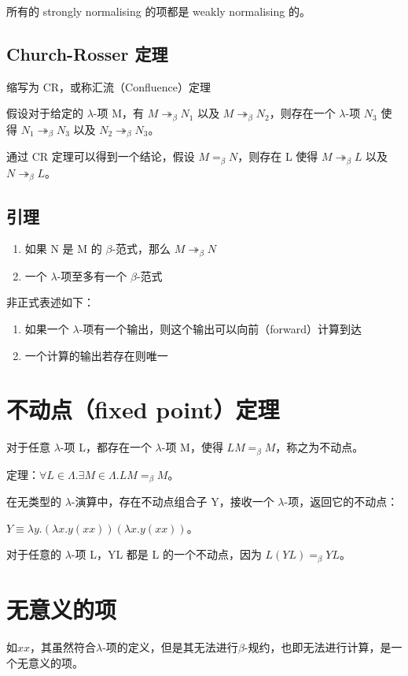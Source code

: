 \documentclass[UTF8]{article}
\begin{document}
	所有的 strongly normalising 的项都是 weakly normalising 的。

\subsection{Church-Rosser 定理}

	缩写为 CR，或称汇流（Confluence）定理

	假设对于给定的 $\lambda$-项 M，有 $M \twoheadrightarrow_\beta N_1$ 以及 $M \twoheadrightarrow_\beta N_2$，则存在一个 $\lambda$-项 $N_3$ 使得 $N_1 \twoheadrightarrow_\beta N_3$ 以及 $N_2 \twoheadrightarrow_\beta N_3$。

	通过 CR 定理可以得到一个结论，假设 $M =_\beta N$，则存在 L 使得 $M \twoheadrightarrow_\beta L$ 以及 $N \twoheadrightarrow_\beta L$。

\subsection{引理}

	\begin{enumerate}
		\item 如果 N 是 M 的 $\beta$-范式，那么 $M \twoheadrightarrow_\beta N$
		\item 一个 $\lambda$-项至多有一个 $\beta$-范式
	\end{enumerate}

	非正式表述如下：
	\begin{enumerate}
		\item 如果一个 $\lambda$-项有一个输出，则这个输出可以向前（forward）计算到达
		\item 一个计算的输出若存在则唯一
	\end{enumerate}

\section{不动点（fixed point）定理}

	对于任意 $\lambda$-项 L，都存在一个 $\lambda$-项 M，使得 $LM =_\beta M$，称之为不动点。

	定理：$\forall L \in \Lambda. \exists M \in \Lambda. LM =_\beta M$。

	在无类型的 $\lambda$-演算中，存在不动点组合子 Y，接收一个 $\lambda$-项，返回它的不动点：

	$Y\equiv \lambda y.(\lambda x.y(xx))(\lambda x.y(xx))$。

	对于任意的 $\lambda$-项 L，YL 都是 L 的一个不动点，因为 $L(YL) =_\beta YL$。

\section{无意义的项}

	如$xx$，其虽然符合$\lambda$-项的定义，但是其无法进行$\beta$-规约，也即无法进行计算，是一个无意义的项。
\end{document}
